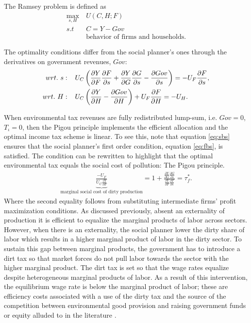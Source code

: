 The Ramsey problem is defined as
\begin{align}
\underset{s, H}{\max}\ & U(C,H; F)\\ s.t\ \ & C=Y-Gov\\ & \text{behavior of firms and households}.
\end{align}

The optimality conditions differ from the social planner's ones through the derivatives on government revenues, $Gov$:
\begin{align}
wrt.\ s:\hspace{4mm} & U_C\left(\frac{\partial Y}{\partial F}\frac{\partial F}{\partial s}+\frac{\partial Y}{\partial G}\frac{\partial G}{\partial s}-\frac{\partial Gov}{ \partial s}\right)=-U_F\frac{\partial F}{\partial s}, \label{eq:sbs}
\\
wrt.\ H:\hspace{4mm} & U_C\left(\frac{\partial Y}{\partial H}-\frac{\partial Gov}{\partial H}\right)+U_F\frac{\partial F}{\partial H}=-U_H\label{eq:sbh}. 
\end{align}

When environmental tax revenues are fully redistributed lump-sum, i.e. $Gov=0$, $T_\iota=0$, then the Pigou principle implements the efficient allocation and the optimal income tax scheme is linear. 
To see this, note that equation \ref{eq:sbs} ensures that the social planner's first order condition, equation \ref{eq:fbs}, is satisfied. 
The condition can be rewritten to highlight that the optimal environmental tax equals the social cost of pollution: The Pigou principle. 
\begin{align}
\underbrace{\frac{-U_F}{U_C\frac{\partial Y}{\partial F}}}_{\text{marginal social cost of dirty production}}=1+\frac{\frac{\partial Y}{\partial G}\frac{\partial G}{\partial s}}{\frac{\partial Y}{\partial F}\frac{\partial F}{\partial s}}=\tau^*_f.
\end{align}
Where the second equality follows from substituting intermediate firms' profit maximization conditions. 
As discussed previously, absent an externality of production it is efficient to equalize the marginal products of labor across sectors. However, when there is an externality, the social planner lower the dirty share of labor which results in a higher marginal product of labor in the dirty sector. To sustain this gap between marginal products, the government has to introduce a dirt tax so that market forces do not pull labor towards the sector with the higher marginal product. The dirt tax is set so that the wage rates equalize despite heterogeneous marginal products of labor. As a result of this intervention, the equilibrium wage rate is below the marginal product of labor; these are efficiency costs associated with a use of the dirty tax and the source of the competition between environmental good provision and raising government funds or equity alluded to in the literature \citep{LansBovenberg1994EnvironmentalTaxation}.  

